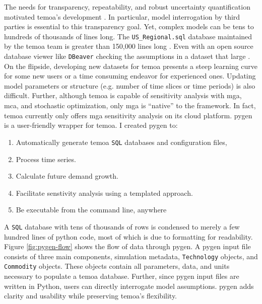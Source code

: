 The needs for transparency, repeatability, and robust uncertainty quantification
motivated \gls{temoa}'s development \cite{hunter_modeling_2013}.
In particular, model interrogation by third parties is essential to this transparency
goal. Yet, complex models can be tens to hundreds of thousands of lines long. The
\texttt{US\_Regional.sql} database maintained by the \gls{temoa} team is greater
than 150,000 lines long \cite{model_databases_2021}. Even with an open source
database viewer like \texttt{DBeaver} checking the assumptions in a dataset that large
\cite{noauthor_dbeaver_nodate}. On the flipside, developing new datasets for
\gls{temoa} presents a steep learning curve for some new users or a time consuming
endeavor for experienced ones. Updating model parameters or structure (e.g. number
of time slices or time periods) is also difficult. Further, although \gls{temoa}
is capable of sensitivity analysis with \gls{mga}, \gls{mca}, and stochastic
optimization, only \gls{mga} is ``native'' to the framework. In fact, \gls{temoa}
currently only offers \gls{mga} sensitivity analysis on its cloud platform.
\gls{pygen} is a user-friendly wrapper for \gls{temoa}.
I created \gls{pygen} to:
\begin{enumerate}
  \item Automatically generate \gls{temoa} \texttt{SQL} databases and configuration files,
  \item Process time series.
  \item Calculate future demand growth.
  \item Facilitate senstivity analysis using a templated approach.
  \item Be executable from the command line, anywhere
\end{enumerate}
A \texttt{SQL} database with tens of thousands of rows is condensed to merely
a few hundred lines of python code, most of which is due to formatting for
readability. Figure \ref{fig:pygen-flow} shows the flow of data through \gls{pygen}.
A \gls{pygen} input file consists of three main components, simulation metadata,
\texttt{Technology} objects, and \texttt{Commodity} objects. These objects
contain all parameters, data, and units necessary to populate a \gls{temoa}
database. Further, since \gls{pygen} input files are written in Python, users
can directly interrogate model assumptions. \gls{pygen} adds clarity and usability
while preserving \gls{temoa}'s flexibility.

